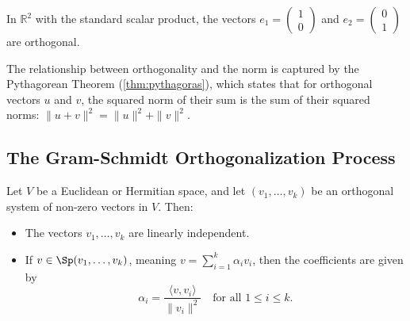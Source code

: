 \begin{example}
    In $\mathbb{R}^2$ with the standard scalar product, the vectors $e_1 = \left(\begin{smallmatrix} 1 \\ 0 \end{smallmatrix}\right)$ and $e_2 = \left(\begin{smallmatrix} 0 \\ 1 \end{smallmatrix}\right)$ are orthogonal.
\end{example}

\begin{remark}
    The relationship between orthogonality and the norm is captured by the Pythagorean Theorem (\cref{thm:pythagoras}), which states that for orthogonal vectors $u$ and $v$, the squared norm of their sum is the sum of their squared norms: $\|u+v\|^2 = \|u\|^2 + \|v\|^2$.
\end{remark}


\subsection{The Gram-Schmidt Orthogonalization Process}

\begin{theorem}
    Let $V$ be a Euclidean or Hermitian space, and let $(v_1, \dots, v_k)$ be an orthogonal system of non-zero vectors in $V$. Then:
    \begin{itemize}
        \item The vectors $v_1, \dots, v_k$ are linearly independent.
        \item If $v \in \Sp(v_1, \dots, v_k)$, meaning $v = \sum_{i=1}^k \alpha_i v_i$, then the coefficients are given by
        \begin{equation*}
            \alpha_i = \frac{\langle v, v_i \rangle}{\|v_i\|^2} \quad \text{for all } 1 \leq i \leq k.
        \end{equation*}
    \end{itemize}
\end{theorem}

